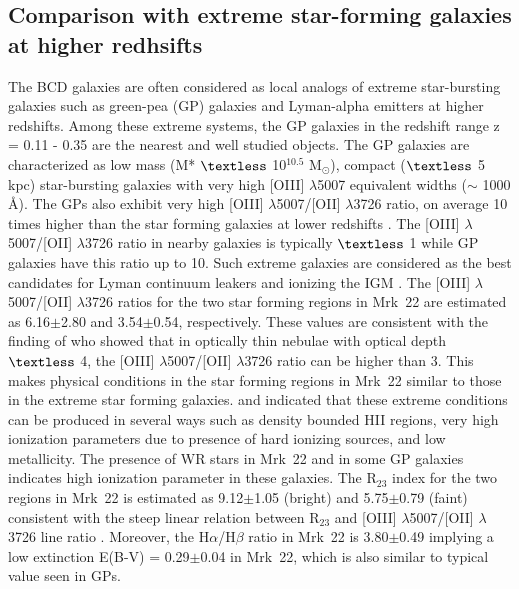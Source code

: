 \documentclass[useAMS,usenatbib]{mn2e}
\begin{document}
\subsection{Comparison with extreme star-forming galaxies at higher redhsifts}

The BCD galaxies are often considered as local analogs of extreme star-bursting galaxies such as green-pea (GP) galaxies and Lyman-alpha emitters at higher redshifts. Among these extreme systems, the GP galaxies in the redshift range z = 0.11 - 0.35 are the nearest and well studied objects. The GP galaxies are characterized as low mass (M* $\textless$ 10$^{10.5}$ M$_{\odot}$), compact ($\textless$ 5 kpc) star-bursting galaxies with very high [O{\small{III}}] $\lambda$5007 equivalent widths ($\sim$ 1000 \AA). The GPs also exhibit very high [O{\small{III}}] $\lambda$5007/[O{\small{II}}] $\lambda$3726 ratio, on average 10 times higher than the star forming galaxies at lower redshifts \citep{2013ApJ...766...91J}. The [O{\small{III}}] $\lambda$5007/[O{\small{II}}] $\lambda$3726 ratio in nearby galaxies is typically $\textless$ 1 while GP galaxies have this ratio up to 10. Such extreme galaxies are considered as the best candidates for Lyman continuum leakers and ionizing the IGM \citep{2010ApJ...708L..69B,2011MNRAS.412..411Y,2014ApJ...791L..19J,2014MNRAS.442..900N,2015ApJ...809...19H}. The [O{\small{III}}] $\lambda$5007/[O{\small{II}}] $\lambda$3726 ratios for the two star forming regions in Mrk~22 are estimated as 6.16$\pm$2.80 and 3.54$\pm$0.54, respectively. These values are consistent with the finding of \citet{2014ApJ...786..155N} who showed that in optically thin nebulae with optical depth $\textless$ 4, the [O{\small{III}}] $\lambda$5007/[O{\small{II}}] $\lambda$3726 ratio can be higher than 3. This makes physical conditions in the star forming regions in Mrk~22 similar to those in the extreme star forming galaxies. \citet{2013ApJ...769....3N} and \citet{2013koa..prop..229N} indicated that these extreme conditions can be produced in several ways such as density bounded H{\small{II}} regions, very high ionization parameters due to presence of hard ionizing sources, and low metallicity. The presence of WR stars in Mrk~22 and in some GP galaxies indicates high ionization parameter in these galaxies. The R$_{23}$ index for the two regions in Mrk~22 is estimated as 9.12$\pm$1.05 (bright) and 5.75$\pm$0.79 (faint) consistent with the steep linear relation between R$_{23}$ and [O{\small{III}}] $\lambda$5007/[O{\small{II}}] $\lambda$3726 line ratio \citep{2013ApJ...769....3N}. Moreover, the H$\alpha$/H$\beta$ ratio in Mrk~22 is 3.80$\pm$0.49 implying a low extinction E(B-V) = 0.29$\pm$0.04 in Mrk~22, which is also similar to typical value seen in GPs. 
\end{document}
